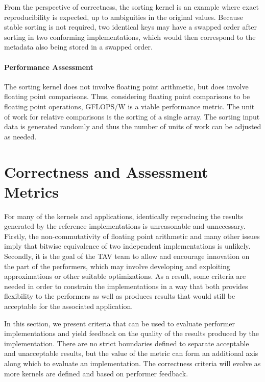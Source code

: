 \documentclass{report}
\begin{document}
From the perspective of correctness, the sorting kernel is an example
where exact reproducibility is expected, up to ambiguities in the
original values.
Because stable sorting is not required, two identical keys may have a
swapped order after sorting in two conforming implementations, which would
then correspond to the metadata also being stored in a swapped order.

\subsubsection{Performance Assessment}

The sorting kernel does not involve floating point arithmetic, but does involve
floating point comparisons.
Thus, considering floating point comparisons to be floating point operations,
GFLOPS/W is a viable performance metric.
The unit of work for relative comparisons is the sorting of a single array.
The sorting input data is generated randomly and thus the number of units of work
can be adjusted as needed.


\chapter{Correctness and Assessment Metrics}

For many of the kernels and applications, identically reproducing the results
generated by the reference implementations is unreasonable and unnecessary.
Firstly, the non-commutativity of floating point arithmetic and many other
issues imply that bitwise equivalence of two independent implementations is
unlikely.
Secondly, it is the goal of the TAV team to allow and encourage innovation
on the part of the performers, which may involve developing and exploiting
approximations or other suitable optimizations.
As a result, some criteria are needed in order to constrain the implementations
in a way that both provides flexibility to the performers as well as produces
results that would still be acceptable for the associated application.

In this section, we present criteria that can be used to evaluate
performer implementations and yield feedback on the quality of the
results produced by the implementation.
There are no strict boundaries defined to separate acceptable and unacceptable
results, but the value of the metric can form an additional axis along
which to evaluate an implementation.
The correctness criteria will evolve as more kernels are defined and based
on performer feedback.
\end{document}

